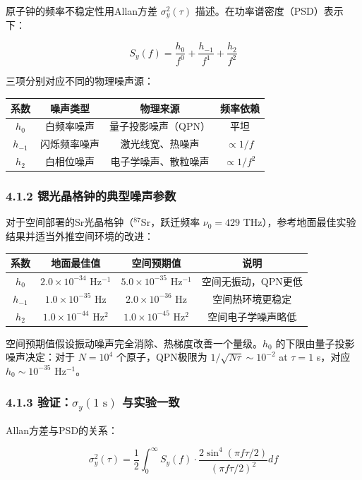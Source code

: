 \documentclass[12pt,a4paper]{article}
\begin{document}
原子钟的频率不稳定性用Allan方差 $\sigma_y^2(\tau)$ 描述。在功率谱密度（PSD）表示下：

$$S_y(f) = \frac{h_0}{f^0} + \frac{h_{-1}}{f^1} + \frac{h_2}{f^2}$$

三项分别对应不同的物理噪声源：

\begin{tabular}{|c|c|c|c|}
\hline
系数 & 噪声类型 & 物理来源 & 频率依赖 \\
\hline
$h_0$ & 白频率噪声 & 量子投影噪声（QPN） & 平坦 \\
$h_{-1}$ & 闪烁频率噪声 & 激光线宽、热噪声 & $\propto 1/f$ \\
$h_2$ & 白相位噪声 & 电子学噪声、散粒噪声 & $\propto 1/f^2$ \\
\hline
\end{tabular}


\subsubsection{4.1.2 锶光晶格钟的典型噪声参数}


对于空间部署的Sr光晶格钟（$^{87}$Sr，跃迁频率 $\nu_0 = 429$ THz），参考地面最佳实验结果并适当外推空间环境的改进：

\begin{tabular}{|c|c|c|c|}
\hline
系数 & 地面最佳值 & 空间预期值 & 说明 \\
\hline
$h_0$ & $2.0 \times 10^{-34}$ Hz$^{-1}$ & $5.0 \times 10^{-35}$ Hz$^{-1}$ & 空间无振动，QPN更低 \\
$h_{-1}$ & $1.0 \times 10^{-35}$ Hz & $2.0 \times 10^{-36}$ Hz & 空间热环境更稳定 \\
$h_2$ & $1.0 \times 10^{-44}$ Hz$^2$ & $1.0 \times 10^{-45}$ Hz$^2$ & 空间电子学噪声略低 \\
\hline
\end{tabular}


空间预期值假设振动噪声完全消除、热梯度改善一个量级。$h_0$ 的下限由量子投影噪声决定：对于 $N = 10^4$ 个原子，QPN极限为 $1/\sqrt{N\tau} \sim 10^{-2}$ at $\tau = 1$ s，对应 $h_0 \sim 10^{-35}$ Hz$^{-1}$。

\subsubsection{4.1.3 验证：$\sigma_y(1\text{ s})$ 与实验一致}


Allan方差与PSD的关系：

$$\sigma_y^2(\tau) = \frac{1}{2} \int_0^\infty S_y(f) \cdot \frac{2\sin^4(\pi f \tau/2)}{(\pi f \tau/2)^2} df$$
\end{document}
